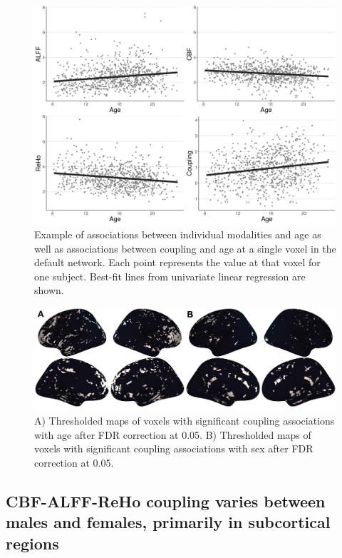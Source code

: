 \documentclass[
  12pt,
]{article}
\begin{document}
\begin{figure}
\includegraphics[width=62.83in]{figures/modality_by_age} \caption{Example of associations between individual modalities and age as well as associations between coupling and age at a single voxel in the default network. Each point represents the value at that voxel for one subject. Best-fit lines from univariate linear regression are shown.}\label{fig:ageexample}
\end{figure}

\begin{figure}
\includegraphics[width=100.01in]{figures/coupling_binary-01} \caption{A) Thresholded maps of voxels with significant coupling associations with age after FDR correction at 0.05. B) Thresholded maps of voxels with significant coupling associations with sex after FDR correction at 0.05.}\label{fig:binary}
\end{figure}

\hypertarget{cbf-alff-reho-coupling-varies-between-males-and-females-primarily-in-subcortical-regions}{%
\subsection{CBF-ALFF-ReHo coupling varies between males and females, primarily in subcortical regions}\label{cbf-alff-reho-coupling-varies-between-males-and-females-primarily-in-subcortical-regions}}
\end{document}

